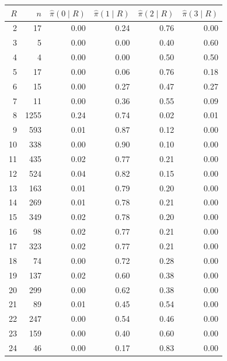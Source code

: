 \begin{tabular}{rrrrrr}
\toprule
$R$ & $n$ & $\hat\pi(0\mid R)$ & $\hat\pi(1\mid R)$ & $\hat\pi(2\mid R)$ & $\hat\pi(3\mid R)$ \\
\midrule
2 & 17 & 0.00 & 0.24 & 0.76 & 0.00 \\
3 & 5 & 0.00 & 0.00 & 0.40 & 0.60 \\
4 & 4 & 0.00 & 0.00 & 0.50 & 0.50 \\
5 & 17 & 0.00 & 0.06 & 0.76 & 0.18 \\
6 & 15 & 0.00 & 0.27 & 0.47 & 0.27 \\
7 & 11 & 0.00 & 0.36 & 0.55 & 0.09 \\
8 & 1255 & 0.24 & 0.74 & 0.02 & 0.01 \\
9 & 593 & 0.01 & 0.87 & 0.12 & 0.00 \\
10 & 338 & 0.00 & 0.90 & 0.10 & 0.00 \\
11 & 435 & 0.02 & 0.77 & 0.21 & 0.00 \\
12 & 524 & 0.04 & 0.82 & 0.15 & 0.00 \\
13 & 163 & 0.01 & 0.79 & 0.20 & 0.00 \\
14 & 269 & 0.01 & 0.78 & 0.21 & 0.00 \\
15 & 349 & 0.02 & 0.78 & 0.20 & 0.00 \\
16 & 98 & 0.02 & 0.77 & 0.21 & 0.00 \\
17 & 323 & 0.02 & 0.77 & 0.21 & 0.00 \\
18 & 74 & 0.00 & 0.72 & 0.28 & 0.00 \\
19 & 137 & 0.02 & 0.60 & 0.38 & 0.00 \\
20 & 299 & 0.00 & 0.62 & 0.38 & 0.00 \\
21 & 89 & 0.01 & 0.45 & 0.54 & 0.00 \\
22 & 247 & 0.00 & 0.54 & 0.46 & 0.00 \\
23 & 159 & 0.00 & 0.40 & 0.60 & 0.00 \\
24 & 46 & 0.00 & 0.17 & 0.83 & 0.00 \\
\bottomrule
\end{tabular}
